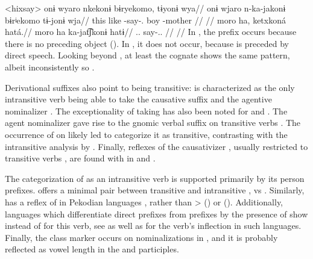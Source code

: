 \pex<hixsay>\hixka
{}
\begingl
\glpreamble onɨ wyaro nkekonɨ bɨryekomo, tɨyonɨ wya//
\gla onɨ wjaro n-ka-jakonɨ bɨrʲekomo tɨ-jonɨ wja//
\glb this like -say-. boy -mother //
\glft {} \parencite[][36]{hixkaryanaderby1985}//
\endgl
{}
\begingl
\glpreamble moro ha, ketxkoná hatá.//
\gla moro ha ka-jat͡ʃkonɨ hatɨ//
\glb {}..  say-.. //
\glft {} \parencite[][14]{derbyshire1965textos}//
\endgl
\xe
In , the prefix  occurs because there is no preceding object ().
In , it does not occur, because  is preceded by direct speech.
Looking beyond \hixka, at least the \trio cognate shows the same pattern, albeit inconsistently so \parencite[267]{triocarlin2004}.

Derivational suffixes also point to   being transitive:
\trio {} is characterized as the only intransitive verb being able to take the causative suffix  and the agentive nominalizer  \parencite[263, 169]{triomeira1999}.
The exceptionality of   taking   has also been noted for \kalina \parencite[82]{courtz2008carib} and \wayana \parencite[258]{wayanatavares2005}.
The agent nominalizer  gave rise to the \panare gnomic verbal suffix  on transitive verbs \parencite[184--185]{gildea1998}.
The occurrence of  on  likely led \textcite[214]{panarepayne2013} to categorize it as transitive, contrasting with the intransitive analysis by \textcite[102]{mattei1994diccionario}.
Finally, reflexes of the causativizer , usually restricted to transitive verbs \parencite{gildea2015valency}, are found with  in \apalai \parencite[51]{koehn1986apalai} and \waiwai \parencite[52]{waiwaihawkins1998}.

The categorization of  as an intransitive verb is supported primarily by its person prefixes.
\kalina offers a minimal pair between transitive   and intransitive  ,   vs   \parencite[288, 45]{courtz2008carib}.
Similarly,  has a reflex of   in Pekodian languages , rather than >  (\bakairi) or  (\PXin).
Additionally, languages which differentiate direct prefixes from  prefixes by the presence of  \parencite[495]{meira2010origin} show  instead of  for this verb, see  as well as \textcites[294]{triomeira1999}[195]{wayanatavares2005}[288]{ikpengpacheco2001}[150]{alves2017arara}[168]{hoff1968carib} for the verb's inflection in such languages.
Finally, the  class marker  occurs on nominalizations in \kalina {}, and it is probably reflected as vowel length in the \trio \parencite[333]{triomeira1999} and \wayana \parencite[196]{wayanatavares2005} participles.

